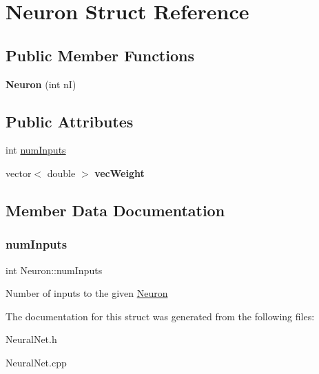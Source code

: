\hypertarget{struct_neuron}{}\section{Neuron Struct Reference}
\label{struct_neuron}
\subsection*{Public Member Functions}
\begin{DoxyCompactItemize}
\item 
\hypertarget{struct_neuron_ad748d6c737ad37c00bb6d9a75ede221d}{}\label{struct_neuron_ad748d6c737ad37c00bb6d9a75ede221d} 
{\bfseries Neuron} (int nI)
\end{DoxyCompactItemize}
\subsection*{Public Attributes}
\begin{DoxyCompactItemize}
\item 
int \hyperlink{struct_neuron_a09992eeceb974593f5bf557aae581d2d}{num\+Inputs}
\item 
\hypertarget{struct_neuron_abc0dcf719541568ee5fa4201d1e3d4b4}{}\label{struct_neuron_abc0dcf719541568ee5fa4201d1e3d4b4} 
vector$<$ double $>$ {\bfseries vec\+Weight}
\end{DoxyCompactItemize}


\subsection{Member Data Documentation}
\hypertarget{struct_neuron_a09992eeceb974593f5bf557aae581d2d}{}\label{struct_neuron_a09992eeceb974593f5bf557aae581d2d} 
\subsubsection{\texorpdfstring{num\+Inputs}{numInputs}}
{\footnotesize\ttfamily int Neuron\+::num\+Inputs}

Number of inputs to the given \hyperlink{struct_neuron}{Neuron} 

The documentation for this struct was generated from the following files\+:\begin{DoxyCompactItemize}
\item 
Neural\+Net.\+h\item 
Neural\+Net.\+cpp\end{DoxyCompactItemize}
